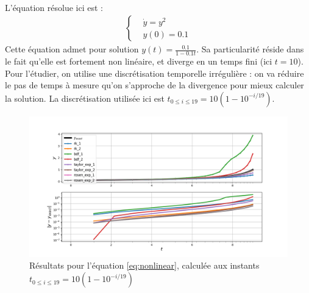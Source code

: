     \paragraph{}
    L'équation résolue ici est :
    \begin{equation}
        \begin{split}
            \left\{
            \begin{aligned}
                &\dot{y} = y^2 \\
                &y\left(0\right) = 0.1
            \end{aligned}
            \right.
        \end{split}
    \label{eq:nonlinear}
    \end{equation}
    Cette équation admet pour solution $y\left(t\right) = \frac{0.1}{1 - 0.1t}$. Sa particularité réside dans le fait qu'elle est fortement non linéaire, et diverge en un temps fini (ici $t = 10$). Pour l'étudier, on utilise une discrétisation temporelle irrégulière : on va réduire le pas de temps à mesure qu'on s'approche de la divergence pour mieux calculer la solution. La discrétisation utilisée ici est $t_{0\leq i\leq 19} = 10\left(1 - 10^{-i/19}\right)$.
    \begin{figure}
        \centering
        \includegraphics[width=\textwidth]{images/results/edo_nonlinear.png}
        \caption{Résultats pour l'équation \ref{eq:nonlinear}, calculée aux instants $t_{0\leq i\leq 19} = 10\left(1 - 10^{-i/19}\right)$}
        \label{fig:edo_non_lineaire}
    \end{figure}
